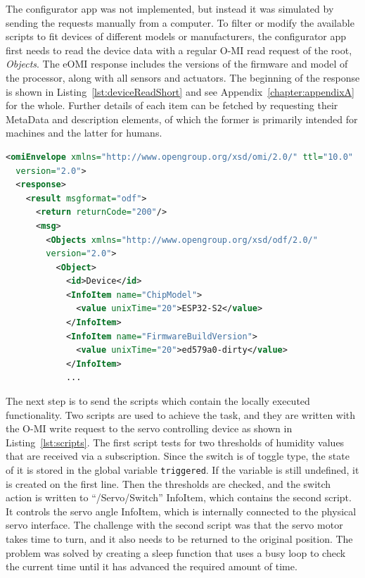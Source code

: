The configurator app was not implemented, but instead it was simulated by sending the requests manually from a computer. To filter or modify the available scripts to fit devices of different models or manufacturers, the configurator app first needs to read the device data with a regular O-MI read request of the root, \emph{Objects}. 
The eOMI response includes the versions of the firmware and model of the processor, along with all sensors and actuators.
The beginning of the response is shown in Listing~\ref{lst:deviceReadShort} and see Appendix~\ref{chapter:appendixA} for the whole. Further details of each item can be fetched by requesting their MetaData and description elements, of which the former is primarily intended for machines and the latter for humans. 

\begin{lstlisting}[language=XML, label={lst:deviceReadShort},caption={Beginning of the read request response from the device showing info about the device and its capabilities}]
<omiEnvelope xmlns="http://www.opengroup.org/xsd/omi/2.0/" ttl="10.0"
  version="2.0">
  <response>
    <result msgformat="odf">
      <return returnCode="200"/>
      <msg>
        <Objects xmlns="http://www.opengroup.org/xsd/odf/2.0/" 
        version="2.0">
          <Object>
            <id>Device</id>
            <InfoItem name="ChipModel">
              <value unixTime="20">ESP32-S2</value>
            </InfoItem>
            <InfoItem name="FirmwareBuildVersion">
              <value unixTime="20">ed579a0-dirty</value>
            </InfoItem>
            ...
\end{lstlisting}

The next step is to send the scripts which contain the locally executed functionality. Two scripts are used to achieve the task, and they are written with the O-MI write request to the servo controlling device as shown in Listing~\ref{lst:scripts}. The first script tests for two thresholds of humidity values that are received via a subscription. Since the switch is of toggle type, the state of it is stored in the global variable \verb+triggered+. If the variable is still undefined, it is created on the first line. Then the thresholds are checked, and the switch action is written to ``/Servo/Switch'' InfoItem, which contains the second script. It controls the servo angle InfoItem, which is internally connected to the physical servo interface. The challenge with the second script was that the servo motor takes time to turn, and it also needs to be returned to the original position. The problem was solved by creating a sleep function that uses a busy loop to check the current time until it has advanced the required amount of time.

